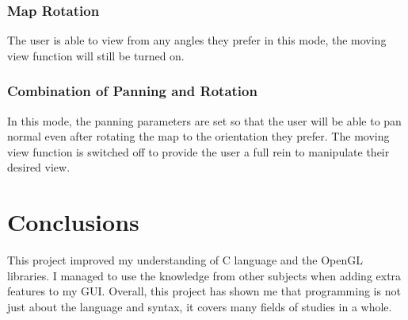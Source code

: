 \documentclass[12pt]{article}
\begin{document}
\subsubsection{Map Rotation}
The user is able to view from any angles they prefer in this mode, the moving view function will still be turned on. 
\subsubsection{Combination of Panning and Rotation}
In this mode, the panning parameters are set so that the user will be able to pan normal even after rotating the map to the orientation they prefer. The moving view function is switched off to provide the user a full rein to manipulate their desired view.
\section{Conclusions}\label{conclusions}
This project improved my understanding of C language and the OpenGL libraries. I managed to use the knowledge from other subjects when adding extra features to my GUI. Overall, this project has shown me that programming is not just about the language and syntax, it covers many fields of studies in a whole.


\end{document}
